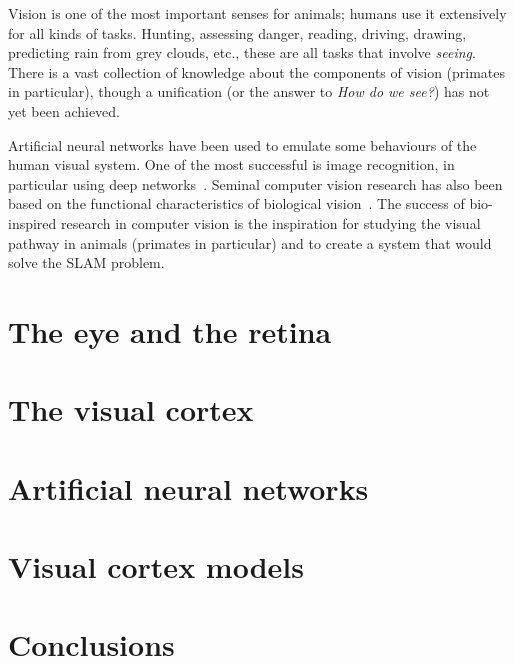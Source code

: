 Vision is one of the most important senses for animals; humans use it extensively for all kinds of tasks. Hunting, assessing danger, reading, driving, drawing, predicting rain from grey clouds, etc., these are all tasks that involve \emph{seeing}. There is a vast collection of knowledge about the components of vision (primates in particular), though a unification (or the answer to \emph{How do we see?}) has not yet been achieved.

Artificial neural networks have been used to emulate some behaviours of the human visual system. One of the most successful is image recognition, in particular using deep networks~\cite{deep-nets-hinton2006fast,krizhevsky2012imagenet}. Seminal computer vision research has also been based on the functional characteristics of biological vision~\cite{lowe1999object,lowe2004distinctive,alahi2012freak}. The success of bio-inspired research in computer vision is the inspiration for studying the visual pathway in animals (primates in particular) and to create a system that would solve the SLAM problem.

\section{The eye and the retina}
\label{sec:vision:eye}


\section{The visual cortex}
\label{sec:vision:cortex}


\section{Artificial neural networks}


\section{Visual cortex models}


\section{Conclusions}
\label{sec:vision:conclusions}

